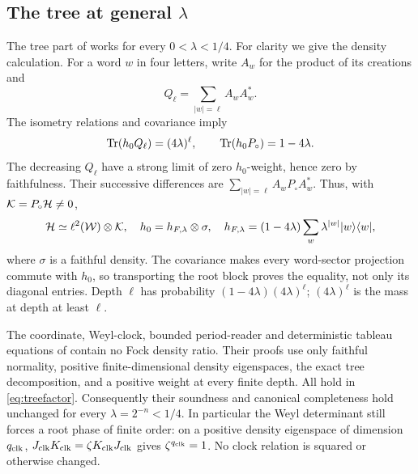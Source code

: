 \subsection{The tree at general \texorpdfstring{$\lambda$}{lambda}}\label{sec:tree}
The tree part of \cite[Section~5]{Sigma2} works for every $0<\lambda<1/4$. For clarity we give the density calculation. For a word $w$ in four letters, write $A_w$ for the product of its creations and
\[
 Q_\ell=\sum_{|w|=\ell}A_wA_w^*.
\]
The isometry relations and covariance imply
\[
 \operatorname{Tr}(h_0Q_\ell)=(4\lambda)^\ell,\qquad
 \operatorname{Tr}(h_0P_\circ)=1-4\lambda.
\]
The decreasing $Q_\ell$ have a strong limit of zero $h_0$-weight, hence zero by faithfulness. Their successive differences are $\sum_{|w|=\ell}A_wP_\circ A_w^*$. Thus, with $\mathcal K=P_\circ\mathcal H\ne0$,
\begin{equation}\label{eq:treefactor}
 \mathcal H\simeq\ell^2(\mathcal W)\otimes\mathcal K,\quad
 h_0=h_{F,\lambda}\otimes\sigma,\quad
 h_{F,\lambda}=(1-4\lambda)\sum_w\lambda^{|w|}|w\rangle\langle w|,
\end{equation}
where $\sigma$ is a faithful density. The covariance makes every word-sector projection commute with $h_0$, so transporting the root block proves the equality, not only its diagonal entries. Depth $\ell$ has probability $(1-4\lambda)(4\lambda)^\ell$; $(4\lambda)^\ell$ is the mass at depth at least $\ell$.

The coordinate, Weyl-clock, bounded period-reader and deterministic tableau equations of \cite[Sections~5--7]{Sigma2} contain no Fock density ratio. Their proofs use only faithful normality, positive finite-dimensional density eigenspaces, the exact tree decomposition, and a positive weight at every finite depth. All hold in \eqref{eq:treefactor}. Consequently their soundness and canonical completeness hold unchanged for every $\lambda=2^{-n}<1/4$. In particular the Weyl determinant still forces a root phase of finite order: on a positive density eigenspace of dimension $q_{\mathrm{clk}}$, $J_{\rm clk}K_{\rm clk}=\zeta K_{\rm clk}J_{\rm clk}$ gives $\zeta^{q_{\mathrm{clk}}}=1$. No clock relation is squared or otherwise changed.

